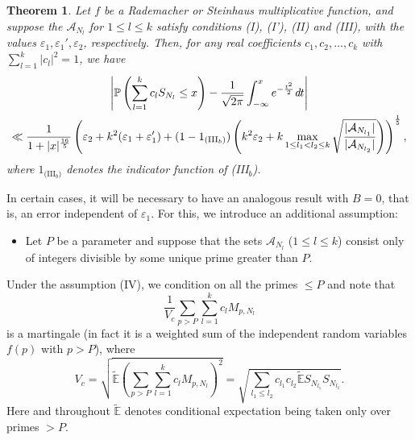 \documentclass[11pt]{tran-l}
\newtheorem{theorem}{Theorem}[section]
\theoremstyle{definition}
\theoremstyle{remark}
\numberwithin{equation}{section}
\begin{document}
\begin{theorem}\label{thm:approxJointGaussian}
    Let $f$ be a Rademacher or Steinhaus multiplicative function, and suppose the $\mathcal A_{N_l}$ for $1\leq l\leq k$  satisfy conditions (I), (I'), (II) and (III), with the values $\varepsilon_1, \varepsilon_1', \varepsilon_2$, respectively. Then, for any real coefficients $c_1, c_2, \ldots, c_k$ with $\sum_{l=1}^k \lvert c_l\rvert^2 = 1$, we have
    \begin{multline*}
\left\lvert\mathbb P\left(\sum_{l=1}^k c_l S_{N_{l}}\leq x \right) - \frac{1}{\sqrt{2\pi}}\int_{-\infty}^x e^{-\frac{t^2}{2}}\emph{d}t\right\rvert \\ \ll \frac{1}{1+\lvert x\rvert^{\frac{16}{5}}}\left(   \varepsilon_2 + k^2(\varepsilon_1 + \varepsilon_1' ) + (1-1_{\text{(III$_b$)}})\left(k^2\varepsilon_2 + k \max_{1\leq l_1<l_2\leq k} \sqrt{\frac{\lvert \mathcal A_{N_{l_1}}\rvert}{\lvert \mathcal A_{N_{l_2}}\rvert}}\right) \right)^{\frac{1}{5}},
 \end{multline*}
 where $1_{\text{(III$_b$)}}$ denotes the indicator function of (III$_b$).
\end{theorem}

In certain cases, it will be necessary to have an analogous result with $B=0$, that is, an error independent of $\varepsilon_1$. For this, we introduce an additional assumption:
\begin{itemize}
    \item[(IV)] Let $P$ be a parameter and suppose that the sets $\mathcal A_{N_l}$ ($1\leq l\leq k$) consist only of integers divisible by some unique prime greater than $P$.
\end{itemize}
Under the assumption (IV), we condition on all the primes $\leq P$ and note that 
\begin{equation*}
    \frac{1}{V_c}\sum_{p>P}\sum_{l=1}^k c_l M_{p, N_l}
\end{equation*} is a martingale (in fact it is a weighted sum of the independent random variables $f(p)$ with $p>P$), where \begin{equation}\label{eq:V_c}
    V_c =\sqrt{\widetilde{\mathbb E}\left(\sum_{p>P}\sum_{l=1}^k c_l M_{p, N_l} \right)^2 } = \sqrt{\sum_{l_1\leq l_2}c_{l_1}c_{l_2}\widetilde{\mathbb E}S_{N_{l_1}}S_{N_{l_2}}}.
\end{equation} Here and throughout $\widetilde{\mathbb E}$ denotes conditional expectation being taken only over primes $>P$. 
\end{document}

